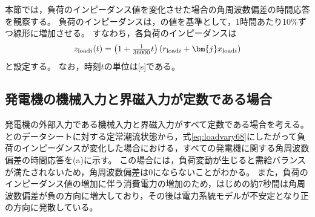 \documentclass[tombow,dvipdfmx]{corona-a5-1.1}
\begin{document}
本節では，負荷のインピーダンス値を変化させた場合の角周波数偏差の時間応答を観察する。
負荷のインピーダンスは，の値を基準として，1時間あたり10\%ずつ線形に増加させる。
すなわち，各負荷のインピーダンスは
\begin{align}\label{eq:loadvary68}
z_{{\rm load}i}(t) = \left(1+\tfrac{1}{36000}t \right) \left( r_{{\rm load}i} + \bm{j} x_{{\rm load}i} \right)
\end{align}
と設定する。
なお，時刻$t$の単位は[s]である。

\subsection{発電機の機械入力と界磁入力が定数である場合}\label{sec:constPV}

発電機の外部入力である機械入力と界磁入力がすべて定数である場合を考える。
とのデータシートに対する定常潮流状態から，式\ref{eq:loadvary68}にしたがって負荷のインピーダンスが変化した場合における，すべての発電機に関する角周波数偏差の時間応答を(a)に示す。
この場合には，負荷変動が生じると需給バランスが満たされないため，角周波数偏差は0にならないことがわかる。
また，負荷のインピーダンス値の増加に伴う消費電力の増加のため，はじめの約7秒間は角周波数偏差が負の方向に増大しており，その後は電力系統モデルが不安定となり正の方向に発散している。
\end{document}
